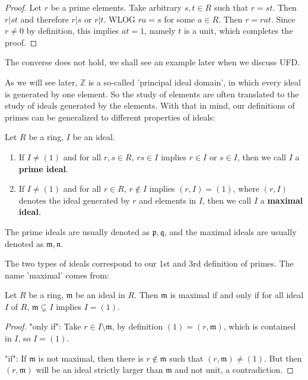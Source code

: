 \documentclass{note-eng}
\begin{document}
\begin{proof}
    Let $r$ be a prime elements. Take arbitrary $s, t \in R$ such that $r = st$. Then $r | st$ and therefore $r | s$ or $r | t$. WLOG $ra = s$ for some $a \in R$. Then $r = rat$. Since $r \ne 0$ by definition, this implies $at = 1$, namely $t$ is a unit, which completes the proof.
\end{proof}

The converse does not hold, we shall see an example later when we discuss UFD. \TODO

As we will see later, $\mathbb{Z}$ is a so-called 'principal ideal domain', in which every ideal is generated by one element. So the study of elements are often translated to the study of ideals generated by the elements. With that in mind, our definitions of primes can be generalized to different properties of ideals:

\begin{definition}
    Let $R$ be a ring, $I$ be an ideal.
    \begin{enumerate}
        \item If $I \ne (1)$ and for all $r, s \in R$, $rs \in I$ implies $r \in I$ or $s \in I$, then we call $I$ a \textbf{prime ideal}.
        \item If $I \ne (1)$ and for all $r \in R$, $r \notin I$ implies $(r, I) = (1)$, where $(r, I)$ denotes the ideal generated by $r$ and elements in $I$, then we call $I$ a \textbf{maximal ideal}.
    \end{enumerate}
    The prime ideals are usually denoted as $\mathfrak{p}, \mathfrak{q}$, and the maximal ideals are usually denoted as $\mathfrak{m}, \mathfrak{n}$.
\end{definition}

The two types of ideals correspond to our 1st and 3rd definition of primes. The name 'maximal' comes from:

\begin{proposition}
    Let $R$ be a ring, $\mathfrak{m}$ be an ideal in $R$. Then $\mathfrak{m}$ is maximal if and only if for all ideal $I$ of $R$, $\mathfrak{m} \subsetneq I$ implies $I = (1)$.
\end{proposition}

\begin{proof}
    "only if": Take $r \in I \setminus \mathfrak{m}$, by definition $(1) = (r, \mathfrak{m})$, which is contained in $I$, so $I = (1)$.

    "if": If $\mathfrak{m}$ is not maximal, then there is $r \notin \mathfrak{m}$ such that $(r, \mathfrak{m}) \ne (1)$. But then $(r, \mathfrak{m})$ will be an ideal strictly larger than $\mathfrak{m}$ and not unit, a contradiction.
\end{proof}
\end{document}
